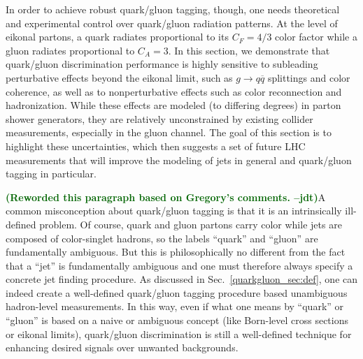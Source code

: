 \documentclass[11pt]{cernrep}
\newcommand{\jdt}[1]{\textbf{\textcolor{darkgreen}{(#1 --jdt)}}}
\begin{document}
In order to achieve robust quark/gluon tagging, though, one needs theoretical and experimental control over quark/gluon radiation patterns.  At the level of eikonal partons, a quark radiates proportional to its $C_F = 4/3$ color factor while a gluon radiates proportional to $C_A = 3$.  In this section, we demonstrate that quark/gluon discrimination performance is highly sensitive to subleading perturbative effects beyond the eikonal limit, such as $g \to q \overline{q}$ splittings and color coherence, as well as to nonperturbative effects such as color reconnection and hadronization.   While these effects are modeled (to differing degrees) in parton shower generators, they are relatively unconstrained by existing collider measurements, especially in the gluon channel.  The goal of this section is to highlight these uncertainties, which then suggests a set of future LHC measurements that will improve the modeling of jets in general and quark/gluon tagging in particular.

\jdt{Reworded this paragraph based on Gregory's comments.}A common misconception about quark/gluon tagging is that it is an intrinsically ill-defined problem.  Of course, quark and gluon partons carry color while jets are composed of color-singlet hadrons, so the labels ``quark'' and ``gluon'' are fundamentally ambiguous. 
But this is philosophically no different from the fact that a ``jet'' is fundamentally ambiguous and one must therefore always specify a concrete jet finding procedure.  As discussed in Sec.~\ref{quarkgluon_sec:def}, one can indeed create a well-defined quark/gluon tagging procedure based unambiguous hadron-level measurements.  In this way, even if what one means by ``quark'' or ``gluon'' is based on a naive or ambiguous concept (like Born-level cross sections or eikonal limits), quark/gluon discrimination is still a well-defined technique for enhancing desired signals over unwanted backgrounds.
  
\end{document}
